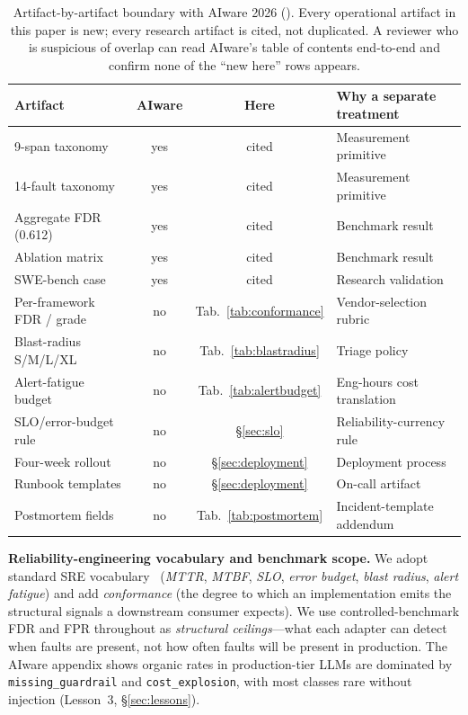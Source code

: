\documentclass[conference]{IEEEtran}
\begin{document}
\begin{table}[t]
\centering
\scriptsize
\caption{Artifact-by-artifact boundary with AIware 2026
(\cite{agenttelemetry_aiware}). Every operational artifact in this
paper is new; every research artifact is cited, not duplicated. A
reviewer who is suspicious of overlap can read AIware's table of
contents end-to-end and confirm none of the ``new here'' rows appears.}
\label{tab:boundary}
\begin{tabular}{@{}lccl@{}}
\toprule
\textbf{Artifact} & \textbf{AIware} & \textbf{Here} & \textbf{Why a separate treatment} \\
\midrule
9-span taxonomy           & yes & cited & Measurement primitive \\
14-fault taxonomy         & yes & cited & Measurement primitive \\
Aggregate FDR (0.612)     & yes & cited & Benchmark result \\
Ablation matrix           & yes & cited & Benchmark result \\
SWE-bench case            & yes & cited & Research validation \\
Per-framework FDR / grade & no  & Tab.~\ref{tab:conformance} & Vendor-selection rubric \\
Blast-radius S/M/L/XL     & no  & Tab.~\ref{tab:blastradius} & Triage policy \\
Alert-fatigue budget      & no  & Tab.~\ref{tab:alertbudget} & Eng-hours cost translation \\
SLO/error-budget rule     & no  & \S\ref{sec:slo}        & Reliability-currency rule \\
Four-week rollout         & no  & \S\ref{sec:deployment} & Deployment process \\
Runbook templates         & no  & \S\ref{sec:deployment} & On-call artifact \\
Postmortem fields         & no  & Tab.~\ref{tab:postmortem} & Incident-template addendum \\
\bottomrule
\end{tabular}
\end{table}

\textbf{Reliability-engineering vocabulary and benchmark scope.}
We adopt standard SRE vocabulary~\cite{sre_book, sre_workbook}
(\emph{MTTR}, \emph{MTBF}, \emph{SLO}, \emph{error budget},
\emph{blast radius}, \emph{alert fatigue}) and add
\emph{conformance} (the degree to which an implementation emits
the structural signals a downstream consumer expects). We use
controlled-benchmark FDR and FPR throughout as \emph{structural
ceilings}---what each adapter can detect when faults are present,
not how often faults will be present in production. The AIware
appendix shows organic rates in production-tier LLMs are dominated
by \texttt{missing\_guardrail} and \texttt{cost\_explosion}, with
most classes rare without injection (Lesson~3, \S\ref{sec:lessons}).
\end{document}
